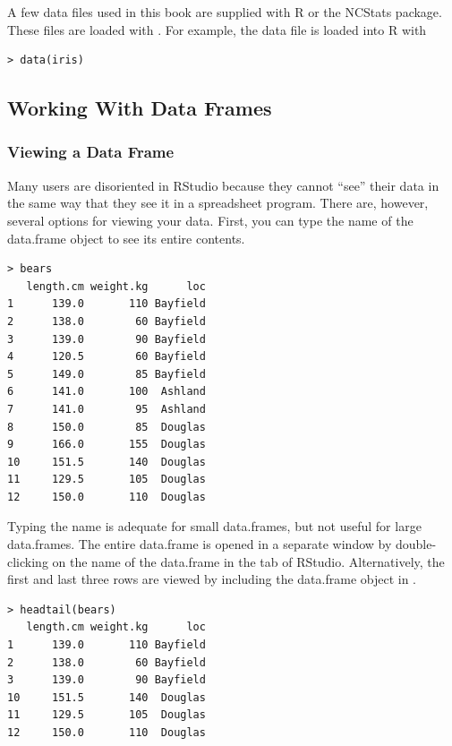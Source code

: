 \documentclass[10pt,openany]{book}\usepackage[]{graphicx}\usepackage[]{color}
\makeatletter
\newenvironment{kframe}{%
 \def\at@end@of@kframe{}%
 \ifinner\ifhmode%
  \def\at@end@of@kframe{\end{minipage}}%
  \begin{minipage}{\columnwidth}%
 \fi\fi%
 \def\FrameCommand##1{\hskip\@totalleftmargin \hskip-\fboxsep
 \colorbox{shadecolor}{##1}\hskip-\fboxsep
     \hskip-\linewidth \hskip-\@totalleftmargin \hskip\columnwidth}%
 \MakeFramed {\advance\hsize-\width
   \@totalleftmargin\z@ \linewidth\hsize
   \@setminipage}}%
 {\par\unskip\endMakeFramed%
 \at@end@of@kframe}
\newenvironment{knitrout}{}{} %
\makeatother
\begin{document}
A few data files used in this book are supplied with R or the NCStats package.  These files are loaded with .  For example, the  data file is loaded into R with
\begin{knitrout}
\color{fgcolor}\begin{kframe}
\begin{verbatim}
> data(iris)
\end{verbatim}
\end{kframe}
\end{knitrout}


\subsection{Working With Data Frames}  \label{sect:RWorkdf}
\subsubsection{Viewing a Data Frame}  \label{sect:RViewdf}
Many users are disoriented in RStudio because they cannot ``see'' their data in the same way that they see it in a spreadsheet program.  There are, however, several options for viewing your data.  First, you can type the name of the data.frame object to see its entire contents.
\begin{knitrout}
\color{fgcolor}\begin{kframe}
\begin{verbatim}
> bears
   length.cm weight.kg      loc
1      139.0       110 Bayfield
2      138.0        60 Bayfield
3      139.0        90 Bayfield
4      120.5        60 Bayfield
5      149.0        85 Bayfield
6      141.0       100  Ashland
7      141.0        95  Ashland
8      150.0        85  Douglas
9      166.0       155  Douglas
10     151.5       140  Douglas
11     129.5       105  Douglas
12     150.0       110  Douglas
\end{verbatim}
\end{kframe}
\end{knitrout}

Typing the name is adequate for small data.frames, but not useful for large data.frames.  The entire data.frame is opened in a separate window by double-clicking on the name of the data.frame in the  tab of RStudio.  Alternatively, the first and last three rows are viewed by including the data.frame object in .
\begin{knitrout}
\color{fgcolor}\begin{kframe}
\begin{verbatim}
> headtail(bears)
   length.cm weight.kg      loc
1      139.0       110 Bayfield
2      138.0        60 Bayfield
3      139.0        90 Bayfield
10     151.5       140  Douglas
11     129.5       105  Douglas
12     150.0       110  Douglas
\end{verbatim}
\end{kframe}
\end{knitrout}
\end{document}
